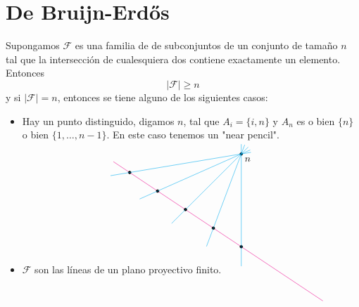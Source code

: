 \documentclass[spanish]{book}
\theoremstyle{definition}
\begin{document}
\section{De Bruijn-Erdős}
\begin{teo}
	Supongamos $\mathcal{F}$ es una familia de de subconjuntos de un conjunto de tamaño $n$ tal que la intersección de cualesquiera dos contiene exactamente un elemento. Entonces
	\[|\mathcal{F}|\geq n\]
	y si $|\mathcal{F}|=n$, entonces se tiene alguno de los siguientes casos:
	\begin{itemize}
		\item Hay un punto distinguido, digamos $n$, tal que $A_i=\{i,n\}$ y $A_n$ es o bien $\{n\}$ o bien $\{1,\ldots,n-1\}$. En este caso tenemos un "near pencil".
		
		\[\begin{tikzpicture}
			\draw[magenta, shorten >=-100pt, shorten <=-20pt] (-2,4/3) -- (2,-4/3);
			
			\filldraw (2,2) circle (0.05) node[below right] {$n$};
			
			\foreach \x in {-2,-1,0,1,2} {
				\filldraw (\x,-\x*2/3) circle (0.05);
			}
			
			\foreach \x in {-2,-1,0,1,2} {
				\draw[cyan, shorten >=-10pt, shorten <=-20pt] (\x,-\x*2/3) -- (2,2);
			}
		\end{tikzpicture}
		\]
		\item $\mathcal{F}$ son las líneas de un plano proyectivo finito.
	\end{itemize}
\end{teo}
\end{document}
